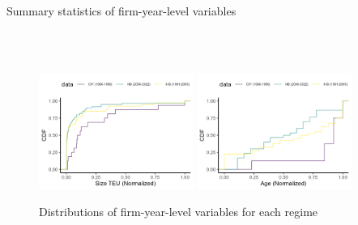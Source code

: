 \documentclass[10pt]{article}
\begin{document}
\begin{table}[!htbp]
  \begin{center}
      \caption{Summary statistics of firm-year-level variables}
      \label{tb:summary_statistics} 
      \subfloat[CIY (1966-1990)]{}\\
      \subfloat[IHS (1991-2005)]{}\\
      \subfloat[HB (2006-2022)]{}
      
  \end{center}\footnotesize
\end{table} 

\begin{figure}[!ht]
\begin{center}
  \includegraphics[width = 0.45\textwidth]
  {figuretable/normalized_size_cdf.png}
  \includegraphics[width = 0.45\textwidth]
  {figuretable/normalized_age_cdf.png}
  \caption{Distributions of firm-year-level variables for each regime}
  \label{fg:size_cdf}
  \end{center}
\footnotesize
\end{figure}
\end{document}
